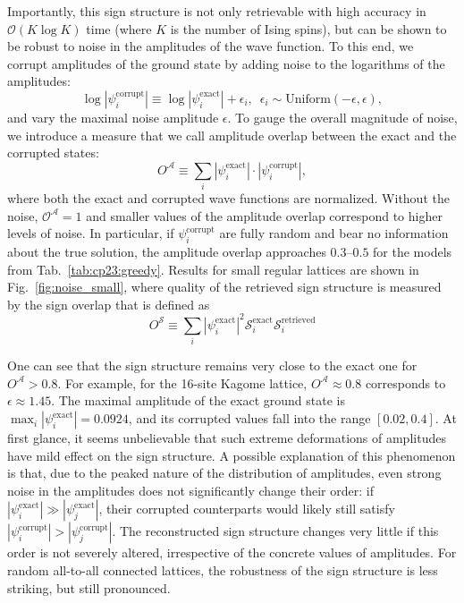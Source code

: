 Importantly, this sign structure is not only retrievable with high accuracy in $\mathcal{O}(K \log K)$ time (where $K$ is the number of Ising spins), but can be shown to be robust to noise in the amplitudes of the wave function. To this end, we corrupt amplitudes of the ground state by adding noise to the logarithms of the amplitudes:
\begin{equation}
    \log \left|\psi^\mathrm{corrupt}_i\right| \equiv \log \left|\psi^\mathrm{exact}_i\right| + \epsilon_i, \,\,\, \epsilon_i \sim \mbox{Uniform}(-\epsilon, \epsilon ), 
\end{equation}
and vary the maximal noise amplitude $\epsilon$. To gauge the overall magnitude of noise, we introduce a measure that we call amplitude overlap between the exact and the corrupted states:
\begin{equation}
    O^\mathcal{A} \equiv \sum_i |\psi^\mathrm{exact}_i|\cdot |\psi^\mathrm{corrupt}_i|,
\end{equation}
where both the exact and corrupted wave functions are normalized. Without the noise, $\mathcal{O}^\mathcal{A} = 1$ and smaller values of the amplitude overlap correspond to higher levels of noise. In particular, if $\psi^\mathrm{corrupt}_i$ are fully random and bear no information about the true solution, the amplitude overlap approaches $0.3$--$0.5$ for the models from Tab.~\ref{tab:cp23:greedy}. Results for small regular lattices are shown in Fig.~\ref{fig:noise_small}, where quality of the retrieved sign structure is measured by the sign overlap that is defined as
\begin{equation}
    O^\mathcal{S} \equiv  \sum_i |\psi^\mathrm{exact}_i|^2 \mathcal{S}_i^\mathrm{exact}\mathcal{S}_i^\mathrm{retrieved}
\end{equation}

\noindent One can see that the sign structure remains very close to the exact one for $O^\mathcal{A} > 0.8$. For example, for the 16-site Kagome lattice, $O^\mathcal{A} \approx 0.8$ corresponds to $\epsilon \approx 1.45$. The maximal amplitude of the exact ground state is $\max_i |\psi^\mathrm{exact}_i| = 0.0924$, and its corrupted values fall into the range $[0.02, 0.4]$. At first glance, it seems unbelievable that such extreme deformations of amplitudes have mild effect on the sign structure. A possible explanation of this phenomenon is that, due to the peaked nature of the distribution of amplitudes, even strong noise in the amplitudes does not significantly change their order: if $|\psi^\mathrm{exact}_i| \gg |\psi^\mathrm{exact}_j|$, their corrupted counterparts would likely still satisfy $|\psi^\mathrm{corrupt}_i| > |\psi^\mathrm{corrupt}_j|$. The reconstructed sign structure changes very little if this order is not severely altered, irrespective of the concrete values of amplitudes. For random all-to-all connected lattices, the robustness of the sign structure is less striking, but still pronounced.

